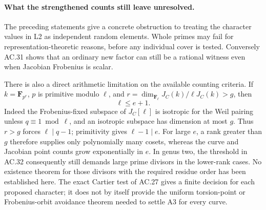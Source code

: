 \paragraph{What the strengthened counts still leave unresolved.}
The preceding statements give a concrete obstruction to treating
the character values in L2 as independent random elements.
Whole primes may fail for representation-theoretic reasons,
before any individual cover is tested. Conversely AC.31 shows
that an ordinary new factor can still be a rational witness even
when Jacobian Frobenius is scalar.

There is also a direct arithmetic limitation on the available
counting criteria. If \(k=\mathbf F_{p^e}\), \(p\) is primitive
modulo \(\ell\), and
\(r=\dim_{\mathbf F_\ell}J_C(k)/\ell J_C(k)>g\), then
\[
                         \ell\le e+1.
\]
Indeed the Frobenius-fixed subspace of \(J_C[\ell]\) is isotropic
for the Weil pairing unless \(q\equiv1\bmod\ell\), and an isotropic
subspace has dimension at most \(g\).
Thus \(r>g\) forces \(\ell\mid q-1\); primitivity gives
\(\ell-1\mid e\).
For large \(e\), a rank greater than \(g\) therefore supplies
only polynomially many cosets, whereas the curve and Jacobian
point counts grow exponentially in \(e\).
In genus two, the threshold in AC.32 consequently still demands
large prime divisors in the lower-rank cases.
No existence theorem for those divisors with the required
residue order has been established here.
The exact Cartier test of AC.27 gives a finite decision for
each proposed character; it does not by itself provide the
uniform torsion-point or Frobenius-orbit avoidance theorem
needed to settle A3 for every curve.


